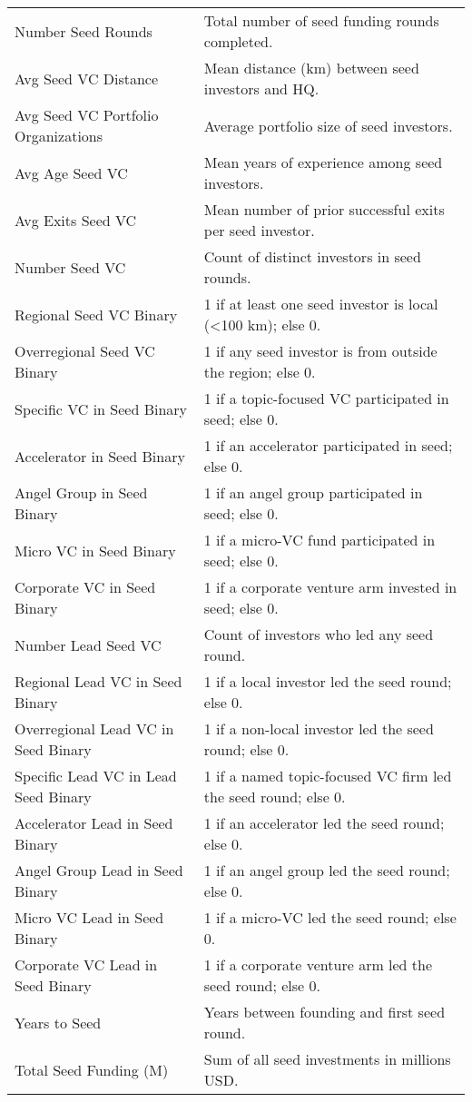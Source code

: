 {\begin{tabular}{p{} p{}}
\addlinespace[0.5em]
\midrule
\multicolumn{2}{c}{\tiny\textsc{TREATMENT VARIABLES}} \\
\midrule
Number Seed Rounds & Total number of seed funding rounds completed. \\[0.4em]
Avg Seed VC Distance & Mean distance (km) between seed investors and HQ. \\[0.4em]
Avg Seed VC Portfolio Organizations & Average portfolio size of seed investors. \\[0.4em]
Avg Age Seed VC & Mean years of experience among seed investors. \\[0.4em]
Avg Exits Seed VC & Mean number of prior successful exits per seed investor. \\[0.4em]
Number Seed VC & Count of distinct investors in seed rounds. \\[0.4em]
Regional Seed VC Binary & 1 if at least one seed investor is local (<100 km); else 0. \\[0.4em]
Overregional Seed VC Binary & 1 if any seed investor is from outside the region; else 0. \\[0.4em]
Specific VC in Seed Binary & 1 if a topic-focused VC participated in seed; else 0. \\[0.4em]
Accelerator in Seed Binary & 1 if an accelerator participated in seed; else 0. \\[0.4em]
Angel Group in Seed Binary & 1 if an angel group participated in seed; else 0. \\[0.4em]
Micro VC in Seed Binary & 1 if a micro-VC fund participated in seed; else 0. \\[0.4em]
Corporate VC in Seed Binary & 1 if a corporate venture arm invested in seed; else 0. \\[0.4em]
Number Lead Seed VC & Count of investors who led any seed round. \\[0.4em]
Regional Lead VC in Seed Binary & 1 if a local investor led the seed round; else 0. \\[0.4em]
Overregional Lead VC in Seed Binary & 1 if a non-local investor led the seed round; else 0. \\[0.4em]
Specific Lead VC in Lead Seed Binary & 1 if a named topic-focused VC firm led the seed round; else 0. \\[0.4em]
Accelerator Lead in Seed Binary & 1 if an accelerator led the seed round; else 0. \\[0.4em]
Angel Group Lead in Seed Binary & 1 if an angel group led the seed round; else 0. \\[0.4em]
Micro VC Lead in Seed Binary & 1 if a micro-VC led the seed round; else 0. \\[0.4em]
Corporate VC Lead in Seed Binary & 1 if a corporate venture arm led the seed round; else 0. \\[0.4em]
Years to Seed & Years between founding and first seed round. \\[0.4em]
Total Seed Funding (M) & Sum of all seed investments in millions USD. \\[0.4em]
\bottomrule
\end{tabular}
}
